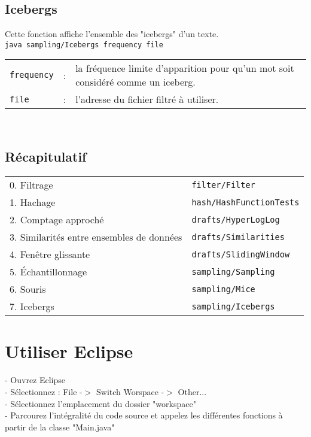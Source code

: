 \documentclass[12pt,a4paper,titlepage]{article}
\newcommand{\code}[1]{ \texttt{\footnotesize #1} }
\begin{document}
\subsection{Icebergs}
Cette fonction affiche l'ensemble des "icebergs" d'un texte.\\
\code{java  sampling/Icebergs frequency file}\\
\begin{tabular}{lcl}
\code{frequency} &:& la fréquence limite d'apparition pour qu'un mot soit considéré comme un iceberg.\\
\code{file} &:& l'adresse du fichier filtré à utiliser.
\end{tabular}\\


\subsection{Récapitulatif}
\begin{center} \begin{tabular}{ll}
0. Filtrage 		 & \code{filter/Filter} \\
1. Hachage 			 & \code{hash/HashFunctionTests} \\
2. Comptage approché & \code{drafts/HyperLogLog} \\
3. Similarités entre ensembles de données & \code{drafts/Similarities} \\
4. Fenêtre glissante & \code{drafts/SlidingWindow} \\
5. Échantillonnage 	 & \code{sampling/Sampling} \\
6. Souris 			 & \code{sampling/Mice} \\
7. Icebergs 		 & \code{sampling/Icebergs}
\end{tabular} \end{center}




\section{Utiliser Eclipse}
- Ouvrez Eclipse\\
- Sélectionnez : File -$>$ Switch Worspace -$>$ Other...\\
- Sélectionnez l'emplacement du dossier "workspace"\\
- Parcourez l'intégralité du code source et appelez les différentes fonctions à partir de la classe "Main.java"
\end{document}
